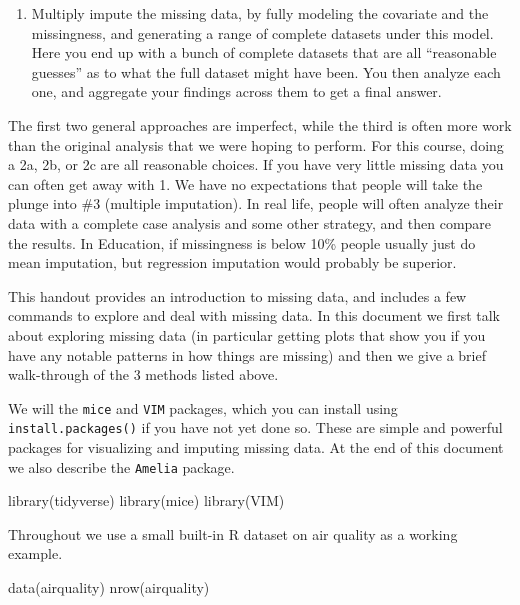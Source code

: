 \documentclass[
  letterpaper,
  DIV=11,
  numbers=noendperiod]{scrreprt}
\newenvironment{Shaded}{\begin{snugshade}}{\end{snugshade}}
\newcommand{\FunctionTok}[1]{\textcolor[rgb]{0.02,0.16,0.49}{#1}}
\newcommand{\NormalTok}[1]{\textcolor[rgb]{0.00,0.44,0.13}{#1}}
\providecommand{\tightlist}{%
  \setlength{\itemsep}{0pt}\setlength{\parskip}{0pt}}\usepackage{longtable,booktabs,array}
\begin{document}
\begin{enumerate}
\def\labelenumi{\arabic{enumi}.}
\setcounter{enumi}{2}
\tightlist
\item
  Multiply impute the missing data, by fully modeling the covariate and
  the missingness, and generating a range of complete datasets under
  this model. Here you end up with a bunch of complete datasets that are
  all ``reasonable guesses'' as to what the full dataset might have
  been. You then analyze each one, and aggregate your findings across
  them to get a final answer.
\end{enumerate}

The first two general approaches are imperfect, while the third is often
more work than the original analysis that we were hoping to perform. For
this course, doing a 2a, 2b, or 2c are all reasonable choices. If you
have very little missing data you can often get away with 1. We have no
expectations that people will take the plunge into \#3 (multiple
imputation). In real life, people will often analyze their data with a
complete case analysis and some other strategy, and then compare the
results. In Education, if missingness is below 10\% people usually just
do mean imputation, but regression imputation would probably be
superior.

This handout provides an introduction to missing data, and includes a
few commands to explore and deal with missing data. In this document we
first talk about exploring missing data (in particular getting plots
that show you if you have any notable patterns in how things are
missing) and then we give a brief walk-through of the 3 methods listed
above.

We will the \texttt{mice} and \texttt{VIM} packages, which you can
install using \texttt{install.packages()} if you have not yet done so.
These are simple and powerful packages for visualizing and imputing
missing data. At the end of this document we also describe the
\texttt{Amelia} package.

\begin{Shaded}
\begin{Highlighting}[]
\FunctionTok{library}\NormalTok{(tidyverse)}
\FunctionTok{library}\NormalTok{(mice)}
\FunctionTok{library}\NormalTok{(VIM)}
\end{Highlighting}
\end{Shaded}

Throughout we use a small built-in R dataset on air quality as a working
example.

\begin{Shaded}
\begin{Highlighting}[]
  \FunctionTok{data}\NormalTok{(airquality)}
  \FunctionTok{nrow}\NormalTok{(airquality)}
\end{Highlighting}
\end{Shaded}
\end{document}
